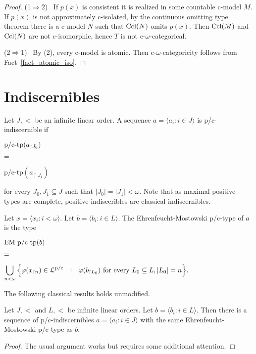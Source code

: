 \documentclass{amsproc}
\begin{document}
{\begin{proof}
  (1$\Rightarrow$2) \ 
  If $p(x)$ is consistent it is realized in some countable c-model $M$.
  If $p(x)$ is not approximately c-isolated, by the continuous omitting type theorem there is a c-model $N$ such that  ${\rm Ccl}(N)$ omits $p(x)$.
  Then ${\rm Ccl}(M)$ and ${\rm Ccl}(N)$ are not c-isomorphic, hence $T$ is not c-$\omega$-categorical.

  (2$\Rightarrow$1) \ 
  By (2), every c-model is atomic.
  Then c-$\omega$-categoricity follows from Fact~\ref{fact_atomic_iso}.
\end{proof}

\section{Indiscernibles}

\def\ceq#1#2#3{\parbox[t]{15ex}{$\displaystyle #1$}\parbox[t]{6ex}{$\displaystyle\hfil #2$}{$\displaystyle #3$}}

Let $J,<$ be an infinite linear order.
A sequence $a=\langle a_i:i\in J\rangle$ is p/c-indiscernible if 

\ceq{\hfill\mbox{p/c-tp}(a_{\restriction J_0})}{=}{\mbox{p/c-tp}(a_{\restriction J_1})}

for every $J_0,J_1\subseteq J$ such that $|J_0|=|J_1|<\omega$.
Note that as maximal positive types are complete, positive indisceribles are classical indiscernibles.

Let $x=\langle x_i:i<\omega\rangle$.
Let $b=\langle b_i:i\in L\rangle$. 
The Ehrenfeucht-Mostowski p/c-type of $a$ is the type

\ceq{\hfill\mbox{EM-p/c-tp}(b)}{=}{\bigcup_{n<\omega}\Big\{\varphi(x_{\restriction n})\in{\EuScript L}^{\rm p/c}\ \ :\ \ \varphi(b_{\restriction L_0})\textrm{ for every } L_0\subseteq L, |L_0|=n\Big\}.}

The following classical results holds unmodified.

\begin{theorem}
  Let $J,<$ and $L,<$ be infinite linear orders.
  Let $b=\langle b_i:i\in L\rangle$.
  Then there is a sequence of p/c-indiscernibles $a=\langle a_i:i\in J\rangle$ with the same Ehrenfeucht-Mostowski p/c-type as $b$.
\end{theorem}

\begin{proof}
  The usual argument works but requires some additional attention.


\end{proof}}
\end{document}
